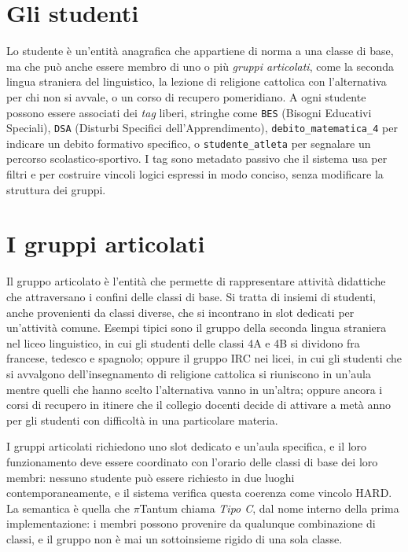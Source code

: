 \section{Gli studenti}

Lo studente \`e un'entit\`a anagrafica che appartiene di
norma a una classe di base, ma che pu\`o anche essere
membro di uno o pi\`u \emph{gruppi articolati}, come la
seconda lingua straniera del linguistico, la lezione di
religione cattolica con l'alternativa per chi non si avvale,
o un corso di recupero pomeridiano. A ogni studente possono
essere associati dei \emph{tag} liberi, stringhe come
\texttt{BES} (Bisogni Educativi Speciali), \texttt{DSA}
(Disturbi Specifici dell'Apprendimento),
\texttt{debito\_matematica\_4} per indicare un debito
formativo specifico, o \texttt{studente\_atleta} per
segnalare un percorso scolastico-sportivo. I tag sono
metadato passivo che il sistema usa per filtri e per
costruire vincoli logici espressi in modo conciso, senza
modificare la struttura dei gruppi.

\section{I gruppi articolati}

Il gruppo articolato \`e l'entit\`a che permette di
rappresentare attivit\`a didattiche che attraversano i
confini delle classi di base. Si tratta di insiemi di
studenti, anche provenienti da classi diverse, che si
incontrano in slot dedicati per un'attivit\`a comune. Esempi
tipici sono il gruppo della seconda lingua straniera nel
liceo linguistico, in cui gli studenti delle classi 4A e 4B
si dividono fra francese, tedesco e spagnolo; oppure il
gruppo IRC nei licei, in cui gli studenti che si avvalgono
dell'insegnamento di religione cattolica si riuniscono in
un'aula mentre quelli che hanno scelto l'alternativa vanno
in un'altra; oppure ancora i corsi di recupero in itinere
che il collegio docenti decide di attivare a met\`a anno
per gli studenti con difficolt\`a in una particolare materia.

I gruppi articolati richiedono uno slot dedicato e un'aula
specifica, e il loro funzionamento deve essere coordinato
con l'orario delle classi di base dei loro membri: nessuno
studente pu\`o essere richiesto in due luoghi
contemporaneamente, e il sistema verifica questa
coerenza come vincolo HARD. La semantica \`e quella che
$\pi$Tantum chiama \emph{Tipo C}, dal nome interno della
prima implementazione: i membri possono provenire da
qualunque combinazione di classi, e il gruppo non \`e mai
un sottoinsieme rigido di una sola classe.

